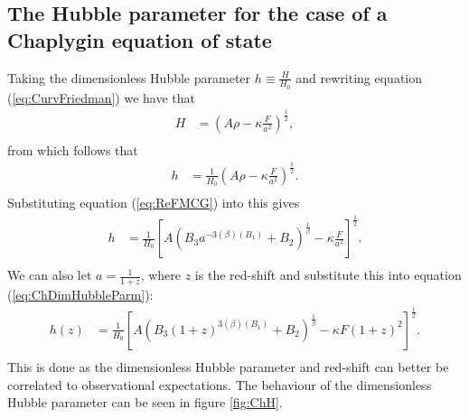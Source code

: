 \documentclass[a4paper, 11pt]{FSKH_623_Report}
\numberwithin{equation}{section}
\newcommand{\brac}[1]{\left(#1\right)}
\newcommand{\bracc}[1]{\left[#1\right]}
\begin{document}
\subsection{The Hubble parameter for the case of a Chaplygin equation of state}
Taking the dimensionless Hubble parameter $h\equiv\frac{H}{H_{0}}$ and rewriting equation (\ref{eq:CurvFriedman}) we have that 
\begin{equation}\label{eq:HubbleParm}
\begin{split}
H &= \brac{A\rho -\kappa\frac{F}{a^{2}}}^{\frac{1}{2}},\\
\end{split}
\end{equation}
from which follows that 
\begin{equation}\label{eq:DimHubbleParm}
\begin{split}
h &= \frac{1}{H_{0}}\brac{A\rho -\kappa\frac{F}{a^{2}}}^{\frac{1}{2}}.\\
\end{split}
\end{equation}
Substituting equation (\ref{eq:ReFMCG}) into this gives
\begin{equation}\label{eq:ChDimHubbleParm}
\begin{split}
h &= \frac{1}{H_{0}}\bracc{A\brac{B_{3}a^{-3\brac{\beta}\brac{B_{1}}}+B_{2}}^{\frac{1}{\beta}} -\kappa\frac{F}{a^{2}}}^{\frac{1}{2}}.\\
\end{split}
\end{equation}
We can also let $a=\frac{1}{1+z}$, where $z$ is the red-shift and substitute this into equation (\ref{eq:ChDimHubbleParm}):
\begin{equation}\label{eq:zChDimHubbleParm}
\begin{split}
h(z) &= \frac{1}{H_{0}}\bracc{A\brac{B_{3}\brac{1+z}^{3\brac{\beta}\brac{B_{1}}}+B_{2}}^{\frac{1}{\beta}} -\kappa F\brac{1+z}^{2}}^{\frac{1}{2}}.\\
\end{split}
\end{equation}
This is done as the dimensionless Hubble parameter and red-shift can better be correlated to observational expectations. The behaviour of the dimensionless Hubble parameter can be seen in figure \ref{fig:ChH}.
\end{document}
